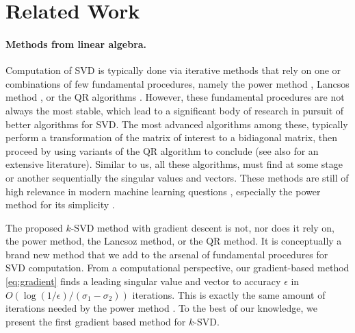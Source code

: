 \section{Related Work}
\label{sec:related}


\paragraph{Methods from linear algebra.} Computation of SVD is typically done via iterative methods that rely on one or combinations of few fundamental procedures, namely the power method \cite{mises1929praktische}, Lancsos method \cite{lanczos1950iteration}, or the QR algorithms \cite{francis1961qr}. However, these fundamental procedures are not always the most stable, which lead to a significant body of research in pursuit of better algorithms for SVD. The most advanced algorithms among these, typically perform a transformation of the matrix of interest to a bidiagonal matrix, then proceed by using variants of the QR algorithm to conclude \cite{demmel1990accurate} (see also \cite{cullum2002lanczos} for an extensive literature). Similar to us, all these algorithms, must find at some stage or another sequentially the singular values and vectors. These methods are still of high relevance in modern machine learning questions \cite{arora2012stochastic,  garber2015fast, shamir2015stochastic, garber2016faster}, especially the power method for its simplicity \cite{hardt2014noisy}.


The proposed $k$-SVD method with gradient descent is not, nor does it rely on, the power  method, the Lancsoz method, or the QR method. It is conceptually a brand new method that we add to the arsenal of fundamental procedures for SVD computation. From a computational perspective, our gradient-based method \eqref{eq:gradient} finds a leading singular value and vector to accuracy $\epsilon$ in $O(\log(1/\epsilon)/(\sigma_1 - \sigma_2))$ iterations. This is exactly the same amount of iterations needed by the power method \cite{mises1929praktische}. To the best of our knowledge, we present the first gradient based method for $k$-SVD.  

